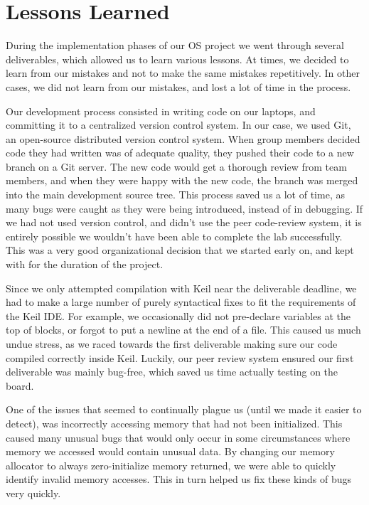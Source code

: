 \documentclass[12pt]{report}
\begin{document}
\part{Lessons Learned}
    During the implementation phases of our OS project we went through several
    deliverables, which allowed us to learn various lessons. At times, we
    decided to learn from our mistakes and not to make the same mistakes
    repetitively. In other cases, we did not learn from our mistakes, and lost a
    lot of time in the process.

    Our development process consisted in writing code on our laptops, and
    committing it to a centralized version control system. In our case, we used
    Git, an open-source distributed version control system. When group members
    decided code they had written was of adequate quality, they pushed their
    code to a new branch on a Git server. The new code would get a thorough
    review from team members, and when they were happy with the new code, the
    branch was merged into the main development source tree. This process saved
    us a lot of time, as many bugs were caught as they were being introduced,
    instead of in debugging.
    If we had not used version control, and didn't use the peer code-review
    system, it is entirely possible we wouldn't have been able to complete the
    lab successfully.
    This was a very good organizational decision that we started early on, and
    kept with for the duration of the project.

    Since we only attempted compilation with Keil near the deliverable deadline,
    we had to make a large number of purely syntactical fixes to fit the
    requirements of the Keil IDE. For example, we occasionally did not
    pre-declare variables at the top of blocks, or forgot to put a newline at
    the end of a file.
    This caused us much undue stress, as we raced towards the first deliverable
    making sure our code compiled correctly inside Keil. Luckily, our peer
    review system ensured our first deliverable was mainly bug-free, which saved
    us time actually testing on the board.

    One of the issues that seemed to continually plague us (until we made it
    easier to detect), was incorrectly accessing memory that had not been
    initialized. This caused many unusual bugs that would only occur in some
    circumstances where memory we accessed would contain unusual data. By
    changing our memory allocator to always zero-initialize memory returned, we
    were able to quickly identify invalid memory accesses. This in turn helped
    us fix these kinds of bugs very quickly.
\end{document}

